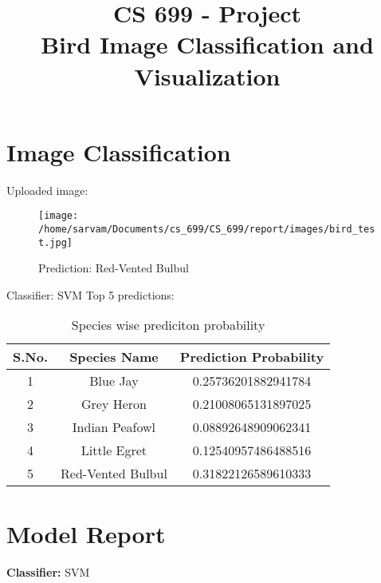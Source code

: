 \documentclass{article}
\date{}
\title{CS 699 - Project\\ Bird Image Classification and Visualization}
\begin{document}
\maketitle

\section{Image Classification}

\noindent Uploaded image:

\begin{figure}[h!]
\centering
\texttt{[image: /home/sarvam/Documents/cs\_699/CS\_699/report/images/bird\_test.jpg]}
\caption*{Prediction: Red-Vented Bulbul}
\label{fig:method}
\end{figure}

\noindent Classifier: SVM
\newline
\newline
\newline
\noindent Top 5 predictions:
\newline
\begin{table}[h!]
\centering
\begin{tabular}{|c|c|c|} 
\hline
 S.No. & Species Name & Prediction Probability\\ 
\hline
 1 & Blue Jay & 0.25736201882941784 \\ 
 \hline
 2 & Grey Heron & 0.21008065131897025 \\  
 \hline
 3 & Indian Peafowl & 0.08892648909062341 \\    
 \hline
 4 & Little Egret & 0.12540957486488516 \\    
 \hline
 5 & Red-Vented Bulbul & 0.31822126589610333 \\    
 \hline
\end{tabular}
\caption{Species wise prediciton probability}
\label{table:data}
\end{table}




\newpage
\section{Model Report}

\textbf{Classifier:} SVM
\newline
\end{document}

